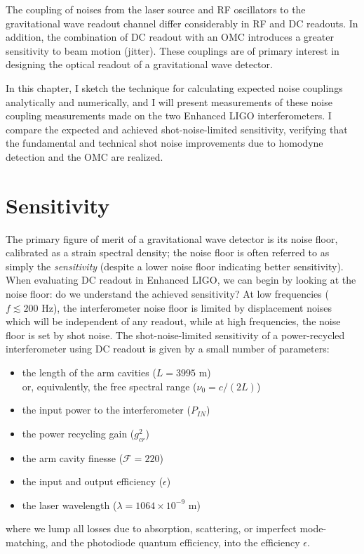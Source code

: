 \label{chapter5}

The coupling of noises from the laser source and RF oscillators to the
gravitational wave readout channel differ considerably in RF and DC
readouts.  In addition, the combination of DC readout with an OMC
introduces a greater sensitivity to beam motion (jitter).  These
couplings are of primary interest in designing the optical readout of
a gravitational wave detector.  

In this chapter, I sketch the technique for calculating expected noise
couplings analytically and numerically, and I will present
measurements of these noise coupling measurements made on the two
Enhanced LIGO interferometers.  I compare the expected and achieved
shot-noise-limited sensitivity, verifying that the fundamental and
technical shot noise improvements due to homodyne detection and the OMC
are realized.

\section{Sensitivity}

The primary figure of merit of a gravitational wave detector is its
noise floor, calibrated as a strain spectral density; the noise floor
is often referred to as simply the \emph{sensitivity} (despite a lower
noise floor indicating better sensitivity).  When evaluating DC
readout in Enhanced LIGO, we can begin by looking at the noise floor:
do we understand the achieved sensitivity?  At low frequencies
($f\lesssim200\text{ Hz}$), the interferometer noise floor is limited
by displacement noises which will be independent of any readout, while
at high frequencies, the noise floor is set by shot noise.  The
shot-noise-limited sensitivity of a power-recycled interferometer
using DC readout is given by a small number of parameters:

\begin{itemize}
\item the length of the arm cavities ($L = 3995$ m)\\ or,
  equivalently, the free spectral range ($\nu_0 = c/(2L)$)
\item the input power to the interferometer ($P_{IN}$)
\item the power recycling gain ($g_{cr}^2$)
\item the arm cavity finesse ($\mathcal{F} = 220$)
\item the input and output efficiency ($\epsilon$)
\item the laser wavelength ($\lambda = 1064\times10^{-9}$ m)
\end{itemize}
where we lump all losses due to absorption, scattering, or imperfect
mode-matching, and the photodiode quantum efficiency, into the efficiency
$\epsilon$.

